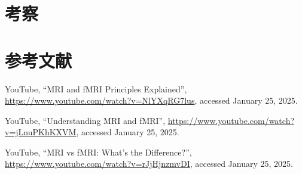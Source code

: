 \documentclass{jlreq}
\begin{document}
\section{考察}



\section*{参考文献}
\begin{thebibliography}{9}

YouTube, ``MRI and fMRI Principles Explained'', \url{https://www.youtube.com/watch?v=NlYXqRG7lus}, accessed January 25, 2025.

YouTube, ``Understanding MRI and fMRI'', \url{https://www.youtube.com/watch?v=jLnuPKhKXVM}, accessed January 25, 2025.

YouTube, ``MRI vs fMRI: What's the Difference?'', \url{https://www.youtube.com/watch?v=rJjHjnzmvDI}, accessed January 25, 2025.

\end{thebibliography}
\end{document}
